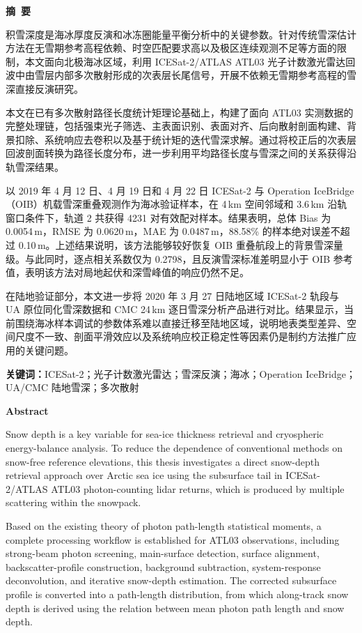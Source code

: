 \cleardoublepage{}
\begin{center}
    \bfseries {} 摘~要
\end{center}

积雪深度是海冰厚度反演和冰冻圈能量平衡分析中的关键参数。针对传统雪深估计方法在无雪期参考高程依赖、时空匹配要求高以及极区连续观测不足等方面的限制，本文面向北极海冰区域，利用 ICESat-2/ATLAS ATL03 光子计数激光雷达回波中由雪层内部多次散射形成的次表层长尾信号，开展不依赖无雪期参考高程的雪深直接反演研究。

本文在已有多次散射路径长度统计矩理论基础上，构建了面向 ATL03 实测数据的完整处理链，包括强束光子筛选、主表面识别、表面对齐、后向散射剖面构建、背景扣除、系统响应去卷积以及基于统计矩的迭代雪深求解。通过将校正后的次表层回波剖面转换为路径长度分布，进一步利用平均路径长度与雪深之间的关系获得沿轨雪深结果。

以 2019 年 4 月 12 日、4 月 19 日和 4 月 22 日 ICESat-2 与 Operation IceBridge（OIB）机载雪深重叠观测作为海冰验证样本，在 4\,km 空间邻域和 3.6\,km 沿轨窗口条件下，轨道 2 共获得 4231 对有效配对样本。结果表明，总体 Bias 为 0.0054\,m，RMSE 为 0.0620\,m，MAE 为 0.0487\,m，88.58\% 的样本绝对误差不超过 0.10\,m。上述结果说明，该方法能够较好恢复 OIB 重叠航段上的背景雪深量级。与此同时，逐点相关系数仅为 0.2798，且反演雪深标准差明显小于 OIB 参考值，表明该方法对局地起伏和深雪峰值的响应仍然不足。

在陆地验证部分，本文进一步将 2020 年 3 月 27 日陆地区域 ICESat-2 轨段与 UA 原位同化雪深数据和 CMC 24\,km 逐日雪深分析产品进行对比。结果显示，当前围绕海冰样本调试的参数体系难以直接迁移至陆地区域，说明地表类型差异、空间尺度不一致、剖面平滑效应以及系统响应校正稳定性等因素仍是制约方法推广应用的关键问题。

\textbf{关键词：}ICESat-2；光子计数激光雷达；雪深反演；海冰；Operation IceBridge；UA/CMC 陆地雪深；多次散射


\cleardoublepage{}
\begin{center}
    \bfseries {} Abstract
\end{center}

Snow depth is a key variable for sea-ice thickness retrieval and cryospheric energy-balance analysis. To reduce the dependence of conventional methods on snow-free reference elevations, this thesis investigates a direct snow-depth retrieval approach over Arctic sea ice using the subsurface tail in ICESat-2/ATLAS ATL03 photon-counting lidar returns, which is produced by multiple scattering within the snowpack.

Based on the existing theory of photon path-length statistical moments, a complete processing workflow is established for ATL03 observations, including strong-beam photon screening, main-surface detection, surface alignment, backscatter-profile construction, background subtraction, system-response deconvolution, and iterative snow-depth estimation. The corrected subsurface profile is converted into a path-length distribution, from which along-track snow depth is derived using the relation between mean photon path length and snow depth.

